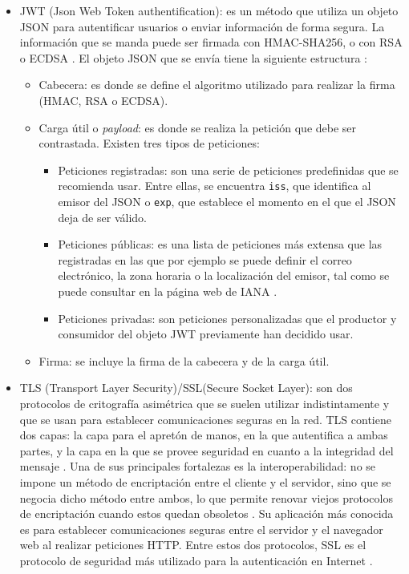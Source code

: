 \begin{itemize}
\item JWT (Json Web Token authentification): es un método que utiliza un objeto JSON para autentificar usuarios o enviar información de forma segura. La información que se manda puede ser firmada con HMAC-SHA256, o con RSA o ECDSA \citep{jwt}. El objeto JSON que se envía tiene la siguiente estructura \citep{rfc7519}:
\begin{itemize}
    \item Cabecera: es donde se define el algoritmo utilizado para realizar la firma (HMAC, RSA o ECDSA).
    \item Carga útil o \textit{payload}: es donde se realiza la petición que debe ser contrastada. Existen tres tipos de peticiones:
    \begin{itemize}
        \item Peticiones registradas: son una serie de peticiones predefinidas que se recomienda usar. Entre ellas, se encuentra \texttt{iss}, que identifica al emisor del JSON o \texttt{exp}, que establece el momento en el que el JSON deja de ser válido.
        \item Peticiones públicas: es una lista de peticiones más extensa que las registradas en las que por ejemplo se puede definir el correo electrónico, la zona horaria o la localización del emisor, tal como se puede consultar en la página web de IANA \citeyear{iana}.
        \item Peticiones privadas: son peticiones personalizadas que el productor y consumidor del objeto JWT previamente han decidido usar.
    \end{itemize}
    \item Firma: se incluye la firma de la cabecera y de la carga útil.
\end{itemize}

\item TLS (Transport Layer Security)/SSL(Secure Socket Layer): son dos protocolos de critografía asimétrica que se suelen utilizar indistintamente y que se usan para establecer comunicaciones seguras en la red. TLS contiene dos capas: la capa para el apretón de manos, en la que autentifica a ambas partes, y la capa en la que se provee seguridad en cuanto a la integridad del mensaje \citep{evaldsson2015evaluate}. Una de sus principales fortalezas es la interoperabilidad: no se impone un método de encriptación entre el cliente y el servidor, sino que se negocia dicho método entre ambos, lo que permite renovar viejos protocolos de encriptación cuando estos quedan obsoletos \citep{carlsson2018comparison}. Su aplicación más conocida es para establecer comunicaciones seguras entre el servidor y el navegador web al realizar peticiones HTTP. Entre estos dos protocolos, SSL es el protocolo de seguridad más utilizado para la autenticación en Internet \citep{viega2002network}.
\end{itemize}

